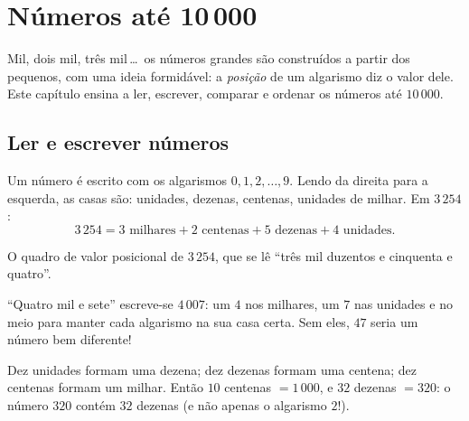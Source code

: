 \chapter{Números até 10\,000}\label{ch:g3:numbers}

Mil, dois mil, três mil\,\dots\ os números grandes são construídos a
partir dos pequenos, com uma ideia formidável: a \emph{posição} de um
algarismo diz o valor dele. Este capítulo ensina a ler, escrever,
comparar e ordenar os números até $10\,000$.

\section{Ler e escrever números}

\begin{definition}\label{def:g3:numbers:place}
Um número é escrito com os algarismos $0, 1, 2, \dots, 9$. Lendo da
direita para a esquerda, as casas são: unidades, dezenas, centenas,
unidades de milhar. Em $3\,254$:
\[
3\,254 = 3 \text{ milhares} + 2 \text{ centenas} + 5 \text{ dezenas}
+ 4 \text{ unidades}.
\]
\end{definition}

\begin{omfigure}

{\small O quadro de valor posicional de $3\,254$, que se lê ``três
mil duzentos e cinquenta e quatro''.}
\end{omfigure}

\begin{example}\label{ex:g3:numbers:zero}
``Quatro mil e sete'' escreve-se $4\,007$: um $4$ nos milhares, um
$7$ nas unidades e \emph{} no meio para manter cada algarismo na
sua casa certa. Sem eles, $47$ seria um número bem diferente!
\end{example}

\begin{example}[Trocar]\label{ex:g3:numbers:exchange}
Dez unidades formam uma dezena; dez dezenas formam uma centena; dez
centenas formam um milhar. Então $10$ centenas $= 1\,000$, e $32$
dezenas $= 320$: o número $320$ contém $32$ dezenas (e não apenas o
algarismo $2$!).
\end{example}

